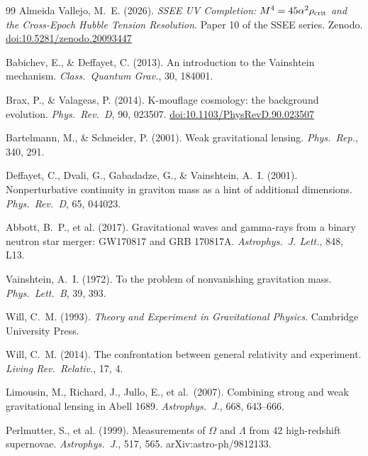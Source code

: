 \documentclass[12pt,a4paper]{article}
\begin{document}
\begin{thebibliography}{99}
  Almeida Vallejo, M.~E. (2026).
  \textit{SSEE UV Completion: $M^4 = 45\alpha^2\rho_{\rm crit}$ and
  the Cross-Epoch Hubble Tension Resolution}.
  Paper 10 of the SSEE series. Zenodo. \href{https://doi.org/10.5281/zenodo.20093447}{doi:10.5281/zenodo.20093447}

  Babichev, E., \& Deffayet, C. (2013).
  An introduction to the Vainshtein mechanism.
  \textit{Class.\ Quantum Grav.}, 30, 184001.

  Brax, P., \& Valageas, P. (2014).
  K-mouflage cosmology: the background evolution.
  \textit{Phys.\ Rev.\ D}, 90, 023507.
  \href{https://doi.org/10.1103/PhysRevD.90.023507}{doi:10.1103/PhysRevD.90.023507}

  Bartelmann, M., \& Schneider, P. (2001).
  Weak gravitational lensing.
  \textit{Phys.\ Rep.}, 340, 291.

  Deffayet, C., Dvali, G., Gabadadze, G., \& Vainshtein, A.~I. (2001).
  Nonperturbative continuity in graviton mass as a hint of additional
  dimensions.
  \textit{Phys.\ Rev.\ D}, 65, 044023.

  Abbott, B.~P., et al. (2017).
  Gravitational waves and gamma-rays from a binary neutron star merger:
  GW170817 and GRB 170817A.
  \textit{Astrophys.\ J. Lett.}, 848, L13.

  Vainshtein, A.~I. (1972).
  To the problem of nonvanishing gravitation mass.
  \textit{Phys.\ Lett.\ B}, 39, 393.

  Will, C.~M. (1993).
  \textit{Theory and Experiment in Gravitational Physics}.
  Cambridge University Press.

  Will, C.~M. (2014).
  The confrontation between general relativity and experiment.
  \textit{Living Rev.\ Relativ.}, 17, 4.

  Limousin, M., Richard, J., Jullo, E., et al.\ (2007).
  Combining strong and weak gravitational lensing in Abell 1689.
  \textit{Astrophys.\ J.}, 668, 643--666.

  Perlmutter, S., et al. (1999).
  Measurements of $\Omega$ and $\Lambda$ from 42 high-redshift supernovae.
  \textit{Astrophys.\ J.}, 517, 565.
  arXiv:astro-ph/9812133.


\end{thebibliography}
\end{document}
